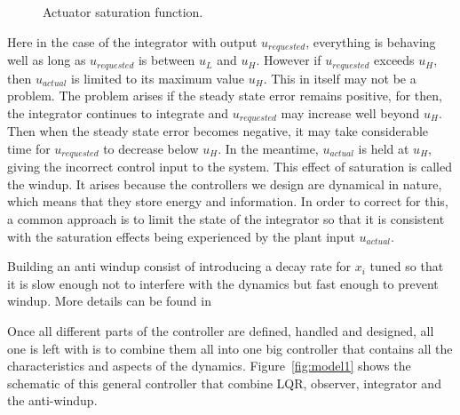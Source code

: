 \documentclass[12pt]{iopart}
\begin{document}
\begin{figure}
	\centering
{}
\caption{Actuator saturation function.}
\label{fig:saturation}
\end{figure}

Here in the case of the integrator with output $u_{requested}$, everything is behaving well as long as $u_{requested}$ is between $u_L$ and $u_H$. However if $u_{requested}$ exceeds $u_H$, then $u_{actual}$ is limited to its maximum value $u_H$. This in itself may not be a problem. The problem arises if the steady state error remains positive, for then, the integrator continues to integrate and $u_{requested}$ may increase well beyond $u_H$. Then when the steady state error becomes negative, it may take considerable time for $u_{requested}$ to decrease below $u_H$. In the meantime, $u_{actual}$ is held at $u_H$, giving the incorrect control input to the system.
This effect of saturation is called the windup. It arises because the controllers we design are dynamical in nature, which means that they store energy and information. In order to correct for this, a common approach is to limit the state of the integrator so that it is consistent with the saturation effects being experienced by the plant input $u_{actual}$.

Building an anti windup consist of introducing a decay rate for $x_i$ tuned so that it is slow enough not to interfere with the dynamics but fast enough to prevent windup.
More details can be found in \cite{Lewis}

Once all different parts of the controller are defined, handled and designed, all one is left with is to combine them all into one big controller that contains all the characteristics and aspects of the dynamics.
Figure~\ref{fig:model1} shows the schematic of this general controller that combine LQR, observer, integrator and the anti-windup.
\end{document}
